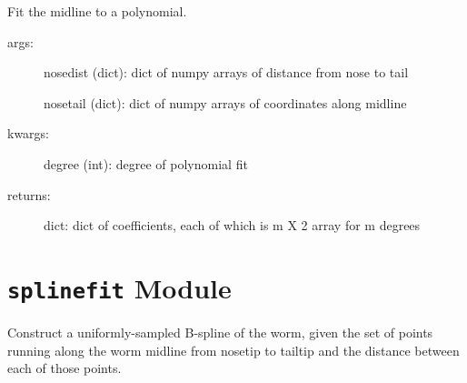 \documentclass[letterpaper,10pt,openany,oneside]{sphinxmanual}
\begin{document}
\begin{fulllineitems}
\label{index:flipheadtail.makepolyfit}
Fit the midline to a polynomial.
\begin{description}
\item[{args:}] \leavevmode
nosedist (dict): dict of numpy arrays of distance from nose to tail

nosetail (dict): dict of numpy arrays of coordinates along midline

\item[{kwargs:}] \leavevmode
degree (int): degree of polynomial fit

\item[{returns:}] \leavevmode
dict: dict of coefficients, each of which is m X 2 array for m degrees

\end{description}

\end{fulllineitems}



\chapter{\texttt{splinefit} Module}
\label{index:splinefit-module}\label{index:module-splinefit}
Construct a uniformly-sampled B-spline of the worm, given the set of points running along the worm midline from nosetip to tailtip and the distance between each of those points.
\end{document}
